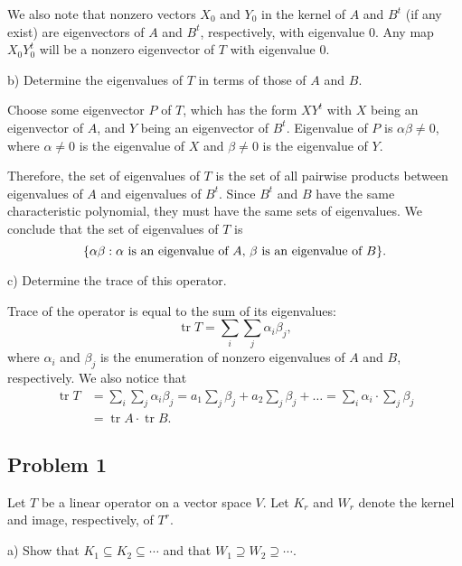 \documentclass{article}
\theoremstyle{definition}
\newcommand{\trace}{\operatorname{tr}}
\DeclarePairedDelimiter\set{\{}{\}}
\begin{document}
We also note that nonzero vectors $X_0$ and $Y_0$ in the kernel of $A$ and $B^t$ (if any exist) are eigenvectors of $A$ and $B^t$, respectively, with eigenvalue $0$.
Any map $X_0 Y_0^t$ will be a nonzero eigenvector of $T$ with eigenvalue $0$.

\begin{tcolorbox}
b) Determine the eigenvalues of $T$ in terms of those of $A$ and $B$.
\end{tcolorbox}

Choose some eigenvector $P$ of $T$, which has the form $X Y^t$ with $X$ being an eigenvector of $A$, and $Y$ being an eigenvector of $B^t$.
Eigenvalue of $P$ is $\alpha \beta \neq 0$, where $\alpha \neq 0$ is the eigenvalue of $X$ and $\beta \neq 0$ is the eigenvalue of $Y$.

Therefore, the set of eigenvalues of $T$ is the set of all pairwise products between eigenvalues of $A$ and eigenvalues of $B^t$.
Since $B^t$ and $B$ have the same characteristic polynomial, they must have the same sets of eigenvalues.
We conclude that the set of eigenvalues of $T$ is
\[ \set*{ \alpha \beta : \text{$\alpha$ is an eigenvalue of $A$, $\beta$ is an eigenvalue of $B$} }. \]

\begin{tcolorbox}
c) Determine the trace of this operator.
\end{tcolorbox}

Trace of the operator is equal to the sum of its eigenvalues:
\[ \trace T = \sum_i \sum_j \alpha_i \beta_j, \]
where $\alpha_i$ and $\beta_j$ is the enumeration of nonzero eigenvalues of $A$ and $B$, respectively.
We also notice that
\begin{align*}
    \trace T 
    & = \sum_i \sum_j \alpha_i \beta_j = a_1 \sum_j \beta_j + a_2 \sum_j \beta_j + \dots = \sum_i \alpha_i \cdot \sum_j \beta_j \\
    & = \trace A \cdot \trace B.    
\end{align*}


\subsection*{Problem 1}

\begin{tcolorbox}
Let $T$ be a linear operator on a vector space $V$. Let $K_r$ and $W_r$ denote the kernel and image, respectively, of $T^r$.

a) Show that $K_1 \subseteq K_2 \subseteq \cdots$ and that $W_1 \supseteq W_2 \supseteq \cdots$.
\end{tcolorbox}
\end{document}

